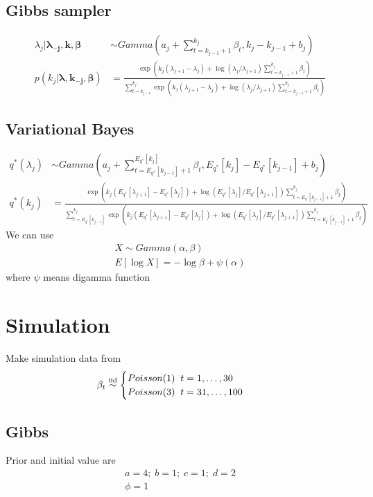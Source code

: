 \documentclass[11pt]{article}
\begin{document}
	\subsection{Gibbs sampler}
	\begin{align*}
	\lambda_j | \boldsymbol{\lambda_{-j}},\boldsymbol{k},\boldsymbol{\beta} &\sim Gamma(a_j + \sum_{t=k_{j-1}+1}^{k_j}\beta_t, k_{j} - k_{j-1} +b_j)\\
	p(k_j | \boldsymbol{\lambda},\boldsymbol{k_{-j}},\boldsymbol{\beta}) &= \frac{\exp(k_j(\lambda_{j+1}- \lambda_j)+ \log(\lambda_j/\lambda_{j+1})\sum_{t=k_{j-1}+1}^{k_j}\beta_t)}{\sum_{t=k_{j-1}}^{k_j}\exp(k_j(\lambda_{j+1}- \lambda_j)+ \log(\lambda_j/\lambda_{j+1})\sum_{t=k_{j-1}+1}^{k_j}\beta_t)}
	\end{align*}
	\subsection{Variational Bayes}
	\begin{align*}
	q^*(\lambda_j) &\sim Gamma(a_j + \sum_{t=E_{q^*}[k_{j-1}]+1}^{E_{q^*}[k_j]}\beta_t, E_{q^*}[k_{j}] - E_{q^*}[k_{j-1}] +b_j)\\
	q^*(k_j)&= \frac{\exp(k_j(E_{q^*}[\lambda_{j+1}]- E_{q^*}[\lambda_j])+ \log(E_{q^*}[\lambda_j]/E_{q^*}[\lambda_{j+1}])\sum_{t=E_{q^*}[k_{j-1}]+1}^{k_j}\beta_t)}{\sum_{t=E_{q^*}[k_{j-1}]}^{k_j}\exp(k_j(E_{q^*}[\lambda_{j+1}]- E_{q^*}[\lambda_j])+ \log(E_{q^*}[\lambda_j]/E_{q^*}[\lambda_{j+1}])\sum_{t=E_{q^*}[k_{j-1}]+1}^{k_j}\beta_t)}
	\end{align*}
	We can use
	\begin{align*}
	X \sim Gamma(\alpha,\beta)\\
	E[\log X] = -\log\beta +\psi(\alpha)
	\end{align*}
	where $\psi$ means digamma function
	
	\section{Simulation}
	Make simulation data from
	\begin{align*}
	\beta_t &\stackrel{\rm iid}{\sim} \begin{cases}
	Poisson(1)\;\; t= 1, \dots ,30 \\
	Poisson(3) \;\; t= 31, \dots ,100
	\end{cases}
	\end{align*}
	

	\subsection{Gibbs}
	Prior and initial value are
	\begin{align*}
	a = 4;\;
	b = 1;\;
	c = 1;\;
	d = 2\\
	\phi = 1
	\end{align*}
\end{document}
